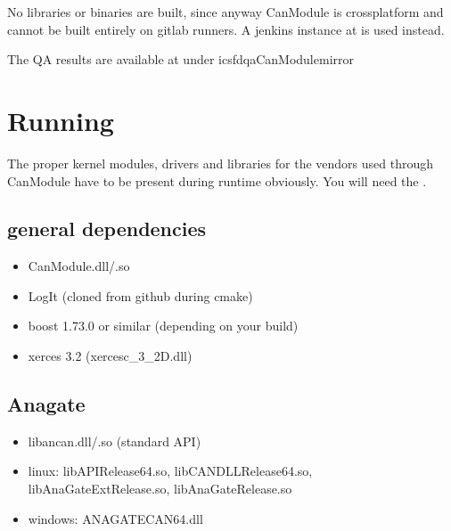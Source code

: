 \documentclass[a4paper,10pt,english]{sphinxmanual}
\begin{document}
\sphinxAtStartPar
No libraries or binaries are built, since anyway CanModule is cross\sphinxhyphen{}platform and cannot be built entirely on gitlab
runners. A jenkins instance at  is used instead.

\sphinxAtStartPar
The QA results are available at  under ics\sphinxhyphen{}fd\sphinxhyphen{}qa\sphinxhyphen{}CanModule\sphinxhyphen{}mirror


\chapter{Running}
\label{\detokenize{running:running}}\label{\detokenize{running::doc}}
\sphinxAtStartPar
The proper kernel modules, drivers and libraries for the vendors used through CanModule
have to be present during runtime obviously. You will need the  .


\section{general dependencies}
\label{\detokenize{running:general-dependencies}}\begin{itemize}
\item {} 
\sphinxAtStartPar
CanModule.dll/.so

\item {} 
\sphinxAtStartPar
LogIt (cloned from github during cmake)

\item {} 
\sphinxAtStartPar
boost 1.73.0 or similar (depending on your build)

\item {} 
\sphinxAtStartPar
xerces 3.2 (xerces\sphinxhyphen{}c\_3\_2D.dll)

\end{itemize}


\section{Anagate}
\label{\detokenize{running:anagate}}\begin{itemize}
\item {} 
\sphinxAtStartPar
libancan.dll/.so  (standard API)

\item {} 
\sphinxAtStartPar
linux: libAPIRelease64.so, libCANDLLRelease64.so, libAnaGateExtRelease.so, libAnaGateRelease.so

\item {} 
\sphinxAtStartPar
windows: ANAGATECAN64.dll

\end{itemize}
\end{document}
